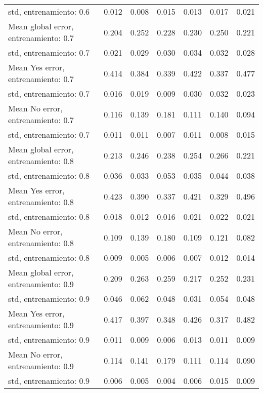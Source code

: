 \begin{longtable}{p{4cm}|p{1.5cm}|p{1.5cm}|p{1.5cm}|p{1.5cm}|p{1.5cm}|p{1.5cm}}
std, entrenamiento: 0.6               & 0.012 & 0.008 &        0.015 &     0.013 &     0.017 & 0.021 \\
Mean global error, entrenamiento: 0.7 & 0.204 & 0.252 &        0.228 &     0.230 &     0.250 & 0.221 \\
std, entrenamiento: 0.7               & 0.021 & 0.029 &        0.030 &     0.034 &     0.032 & 0.028 \\
Mean Yes error, entrenamiento: 0.7    & 0.414 & 0.384 &        0.339 &     0.422 &     0.337 & 0.477 \\
std, entrenamiento: 0.7               & 0.016 & 0.019 &        0.009 &     0.030 &     0.032 & 0.023 \\
Mean No error, entrenamiento: 0.7     & 0.116 & 0.139 &        0.181 &     0.111 &     0.140 & 0.094 \\
std, entrenamiento: 0.7               & 0.011 & 0.011 &        0.007 &     0.011 &     0.008 & 0.015 \\
Mean global error, entrenamiento: 0.8 & 0.213 & 0.246 &        0.238 &     0.254 &     0.266 & 0.221 \\
std, entrenamiento: 0.8               & 0.036 & 0.033 &        0.053 &     0.035 &     0.044 & 0.038 \\
Mean Yes error, entrenamiento: 0.8    & 0.423 & 0.390 &        0.337 &     0.421 &     0.329 & 0.496 \\
std, entrenamiento: 0.8               & 0.018 & 0.012 &        0.016 &     0.021 &     0.022 & 0.021 \\
Mean No error, entrenamiento: 0.8     & 0.109 & 0.139 &        0.180 &     0.109 &     0.121 & 0.082 \\
std, entrenamiento: 0.8               & 0.009 & 0.005 &        0.006 &     0.007 &     0.012 & 0.014 \\
Mean global error, entrenamiento: 0.9 & 0.209 & 0.263 &        0.259 &     0.217 &     0.252 & 0.231 \\
std, entrenamiento: 0.9               & 0.046 & 0.062 &        0.048 &     0.031 &     0.054 & 0.048 \\
Mean Yes error, entrenamiento: 0.9    & 0.417 & 0.397 &        0.348 &     0.426 &     0.317 & 0.482 \\
std, entrenamiento: 0.9               & 0.011 & 0.009 &        0.006 &     0.013 &     0.011 & 0.009 \\
Mean No error, entrenamiento: 0.9     & 0.114 & 0.141 &        0.179 &     0.111 &     0.114 & 0.090 \\
std, entrenamiento: 0.9               & 0.006 & 0.005 &        0.004 &     0.006 &     0.015 & 0.009 \\

\end{longtable}
